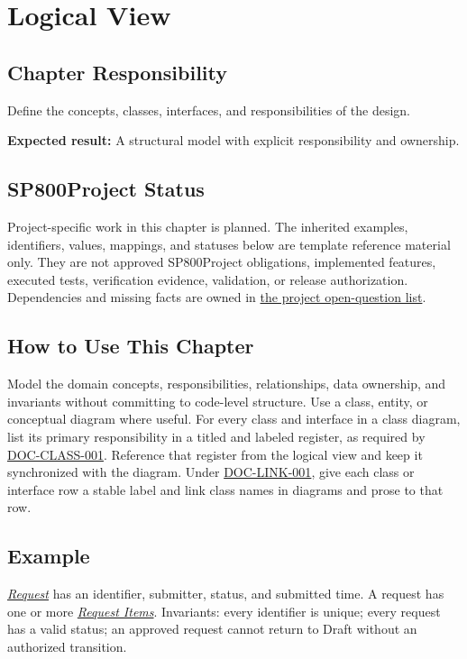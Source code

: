 \chapter{Logical View}
\section{Chapter Responsibility}
\label{Section:LogicalViewResponsibility}
Define the concepts, classes, interfaces, and responsibilities of the design.

\noindent\textbf{Expected result:} A structural model with explicit responsibility and ownership.

\section{SP800Project Status}
\label{Section:SP800StatusLogicalView}
Project-specific work in this chapter is planned. The inherited examples,
identifiers, values, mappings, and statuses below are template reference
material only. They are not approved SP800Project obligations, implemented features,
executed tests, verification evidence, validation, or release authorization.
Dependencies and missing facts are owned in
\hyperref[Section:SP800OpenQuestions]{the project open-question list}.

\section{How to Use This Chapter}
Model the domain concepts, responsibilities, relationships, data ownership, and invariants without committing to code-level structure. Use a class, entity, or conceptual diagram where useful. For every class and interface in a class diagram, list its primary responsibility in a titled and labeled register, as required by \hyperref[Requirement:DOCCLASS001]{DOC-CLASS-001}. Reference that register from the logical view and keep it synchronized with the diagram. Under \hyperref[Requirement:DOCLINK001]{DOC-LINK-001}, give each class or interface row a stable label and link class names in diagrams and prose to that row.
\section{Example}
\hyperref[Class:Request]{\textit{Request}} has an identifier, submitter, status, and submitted time. A request has one or more \hyperref[Class:RequestItem]{\textit{Request Items}}. Invariants: every identifier is unique; every request has a valid status; an approved request cannot return to Draft without an authorized transition.


